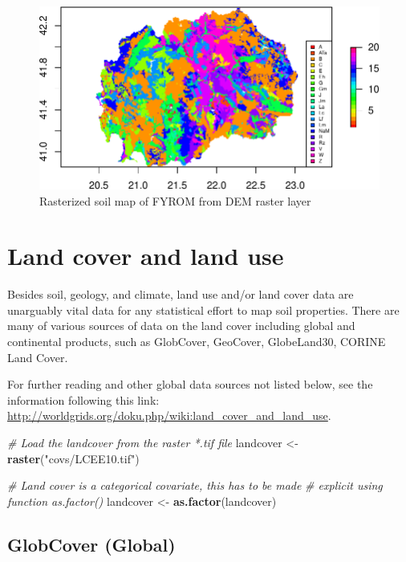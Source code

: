 \documentclass[10pt,b5paper,]{book}
\newenvironment{Shaded}{\begin{snugshade}}{\end{snugshade}}
\newcommand{\CommentTok}[1]{\textcolor[rgb]{0.56,0.35,0.01}{\textit{#1}}}
\newcommand{\KeywordTok}[1]{\textcolor[rgb]{0.13,0.29,0.53}{\textbf{#1}}}
\newcommand{\NormalTok}[1]{#1}
\newcommand{\StringTok}[1]{\textcolor[rgb]{0.31,0.60,0.02}{#1}}
\theoremstyle{definition}
\theoremstyle{definition}
\theoremstyle{definition}
\theoremstyle{remark}
\begin{document}
\begin{figure}
\centering
\includegraphics{SOCMapping_files/figure-latex/unnamed-chunk-20-1.pdf}
\caption{\label{fig:unnamed-chunk-20}Rasterized soil map of FYROM from DEM
raster layer}
\end{figure}

\hypertarget{land-cover-and-land-use}{%
\section{Land cover and land use}\label{land-cover-and-land-use}}

Besides soil, geology, and climate, land use and/or land cover data are
unarguably vital data for any statistical effort to map soil properties.
There are many of various sources of data on the land cover including
global and continental products, such as GlobCover, GeoCover,
GlobeLand30, CORINE Land Cover.

For further reading and other global data sources not listed below, see
the information following this link:
\url{http://worldgrids.org/doku.php/wiki:land_cover_and_land_use}.

\begin{Shaded}
\begin{Highlighting}[]
\CommentTok{# Load the landcover from the raster *.tif file}
\NormalTok{landcover <-}\StringTok{ }\KeywordTok{raster}\NormalTok{(}\StringTok{"covs/LCEE10.tif"}\NormalTok{)}

\CommentTok{# Land cover is a categorical covariate, this has to be made }
\CommentTok{# explicit using function as.factor()}
\NormalTok{landcover <-}\StringTok{ }\KeywordTok{as.factor}\NormalTok{(landcover)}
\end{Highlighting}
\end{Shaded}

\hypertarget{globcover-global}{%
\subsection{GlobCover (Global)}\label{globcover-global}}
\end{document}
